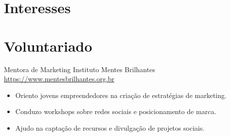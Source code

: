 \documentclass[a4paper, serif, 10pt]{moderncv}
\begin{document}
\section{Interesses}

\section{Voluntariado}

        {Mentora de Marketing}
        {Instituto Mentes Brilhantes}
        {\url{https://www.mentesbrilhantes.org.br}}
        {}
        {\begin{itemize}
\item Oriento jovens empreendedores na criação de estratégias de marketing.
\item Conduzo workshops sobre redes sociais e posicionamento de marca.
\item Ajudo na captação de recursos e divulgação de projetos sociais.
\end{itemize}}
    
\end{document}
